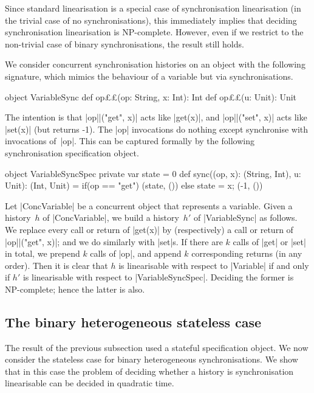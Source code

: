 Since standard linearisation is a special case of synchronisation
linearisation (in the trivial case of no synchronisations), this immediately
implies that deciding synchronisation linearisation is NP-complete.  However,
even if we restrict to the non-trivial case of binary synchronisations, the
result still holds.

We consider concurrent synchronisation histories on an object with the
following signature, which mimics the behaviour of a variable but via
synchronisations. 
%
\begin{scala}
object VariableSync{
  def op££(op: String, x: Int): Int
  def op££(u: Unit): Unit
} 
\end{scala}
%
The intention is that |op||("get", x)| acts like |get(x)|, and
|op||("set", x)| acts like |set(x)| (but returns -1).  The |op|
invocations do nothing except synchronise with invocations of~|op|.  This
can be captured formally by the following synchronisation specification
object.
%
\begin{scala}
object VariableSyncSpec{
  private var state = 0
  def sync((op, x): (String, Int), u: Unit): (Int, Unit) = 
    if(op == "get") (state, ()) else{ state = x; (-1, ()) }
}
\end{scala}


Let |ConcVariable| be a concurrent object that represents a variable.  Given a
history~$h$ of |ConcVariable|, we build a history~$h'$
of |VariableSync| as follows.  We replace every call or return of |get(x)| by
(respectively) a call or return of |op||("get", x)|; and we do similarly
with |set|s.  If there are $k$ calls of |get| or |set| in total, we prepend
$k$ calls of |op|, and append $k$ corresponding returns (in any order).
%
Then it is clear that $h$ is linearisable with respect to |Variable| if and
only if $h'$ is linearisable with respect to |VariableSyncSpec|.  Deciding the
former is NP-complete; hence the latter is also. 




\subsection{The binary heterogeneous stateless case}
\label{sec:binary-heterogeneous}

The result of the previous subsection used a stateful specification object.
We now consider the stateless case for binary heterogeneous synchronisations.
We show that in this case the problem of deciding whether a history is
synchronisation linearisable can be decided in quadratic time.

